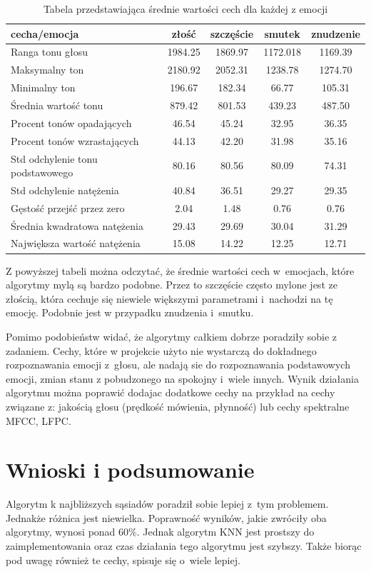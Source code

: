 \documentclass[declaration,shortabstract]{iithesis}
\begin{document}
\begin{table}[p]
\caption{Tabela przedstawiająca średnie wartości cech dla każdej z emocji}
  \begin{tabular}{|l|c|c|c|c|}
    \hline
    cecha/emocja & złość & szczęście & smutek & znudzenie \\ \hline
    Ranga tonu głosu & 1984.25 & 1869.97 & 1172.018 & 1169.39 \\ \hline
    Maksymalny ton & 2180.92 & 2052.31 & 1238.78 & 1274.70\\ \hline
    Minimalny ton & 196.67 & 182.34 & 66.77 & 105.31 \\ \hline
    Średnia wartość tonu & 879.42 & 801.53 & 439.23 & 487.50\\ \hline
	Procent tonów opadających & 46.54 & 45.24 & 32.95 & 36.35 \\ \hline
	Procent tonów wzrastających & 44.13 & 42.20 & 31.98 & 35.16 \\ \hline
	Std odchylenie tonu podstawowego & 80.16 & 80.56 & 80.09 & 74.31 \\ \hline
	Std odchylenie natężenia & 40.84 & 36.51 & 29.27 & 29.35 \\ \hline
	Gęstość przejść przez zero & 2.04 & 1.48 & 0.76 & 0.76 \\ \hline
	Średnia kwadratowa natężenia & 29.43 & 29.69 & 30.04 & 31.29 \\ \hline
	Największa wartość natężenia & 15.08 & 14.22 & 12.25 & 12.71 \\ \hline
  \end{tabular}
  \label{sr_war}
\end{table}

Z powyższej tabeli można odczytać, że średnie wartości cech w~emocjach, które algorytmy mylą są bardzo podobne. Przez to szczęście często mylone jest ze złością, która cechuje się niewiele większymi parametrami i~nachodzi na tę emocję. Podobnie jest w przypadku znudzenia i~smutku. 

Pomimo podobieństw widać, że algorytmy całkiem dobrze poradziły sobie z zadaniem. Cechy, które w projekcie użyto nie wystarczą do dokładnego rozpoznawania emocji z~głosu, ale nadają sie do rozpoznawania podstawowych emocji, zmian stanu z pobudzonego na spokojny i~wiele innych. Wynik działania algorytmu można poprawić dodajac dodatkowe cechy na przykład na cechy związane z: jakością głosu (prędkość mówienia, płynność) lub cechy spektralne MFCC, LFPC. 

\chapter{Wnioski i podsumowanie}
Algorytm k najbliższych sąsiadów poradził sobie lepiej z~tym problemem. Jednakże różnica jest niewielka. Poprawność wyników, jakie zwróciły oba algorytmy, wynosi ponad 60\%. Jednak algorytm KNN jest prostszy do zaimplementowania oraz czas działania tego algorytmu jest szybszy. Także biorąc pod uwagę również te cechy, spisuje się o~wiele lepiej.
\end{document}
